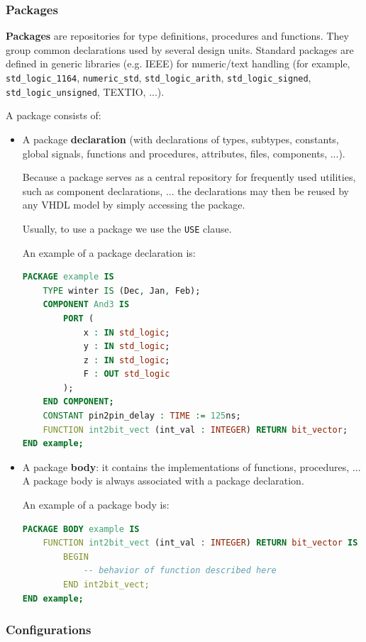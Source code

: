 \documentclass[a4paper,11pt]{article}
\begin{document}
\subsubsection{Packages}

\textbf{Packages} are repositories for type definitions, procedures and functions.
They group common declarations used by several design units.
Standard packages are defined in generic libraries (e.g. IEEE) for numeric/text handling (for example, \texttt{std\_logic\_1164}, \texttt{numeric\_std}, \texttt{std\_logic\_arith}, \texttt{std\_logic\_signed}, \texttt{std\_logic\_unsigned}, TEXTIO, ...).

A package consists of:
\begin{itemize}
	\item A package \textbf{declaration} (with declarations of types, subtypes, constants, global signals, functions and procedures, attributes, files, components, ...).

	      Because a package serves as a central repository for frequently used utilities, such as component declarations, ... the declarations may then be reused by any VHDL model by simply accessing the package.

	      Usually, to use a package we use the \texttt{USE} clause.

	      An example of a package declaration is:
	      \begin{lstlisting}[language=VHDL, style=codestyle]	
PACKAGE example IS
	TYPE winter IS (Dec, Jan, Feb);
	COMPONENT And3 IS
		PORT (
			x : IN std_logic;
			y : IN std_logic;
			z : IN std_logic;
			F : OUT std_logic
		);
	END COMPONENT;
	CONSTANT pin2pin_delay : TIME := 125ns;
	FUNCTION int2bit_vect (int_val : INTEGER) RETURN bit_vector;
END example;
\end{lstlisting}
	\item A package \textbf{body}: it contains the implementations of functions, procedures, ... A package body is always associated with a package declaration.

	      An example of a package body is:
	      \begin{lstlisting}[language=VHDL, style=codestyle]	
PACKAGE BODY example IS
	FUNCTION int2bit_vect (int_val : INTEGER) RETURN bit_vector IS
		BEGIN
			-- behavior of function described here
		END int2bit_vect;
END example;
\end{lstlisting}
\end{itemize}

\subsubsection{Configurations}
\end{document}
